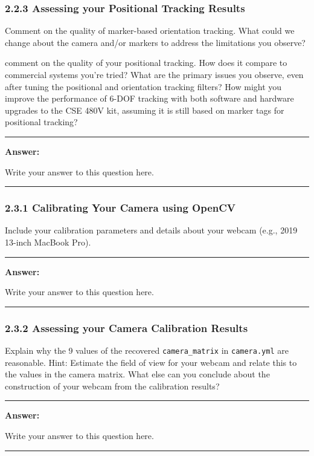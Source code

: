 \documentclass[conference]{styles/acmsiggraph}
\newenvironment{answer}{}{}
\begin{document}
\subsubsection*{2.2.3 Assessing your Positional Tracking Results}
Comment on the quality of marker-based orientation tracking. What could we change about the camera and/or markers to address the limitations you observe?

comment on the quality of your positional tracking. How does it compare to commercial systems you're tried? What are the primary issues you observe, even after tuning the positional and orientation tracking filters? How might you improve the performance of 6-DOF tracking with both software and hardware upgrades to the CSE 480V kit, assuming it is still based on marker tags for positional tracking?

\begin{answer}
\rule{\textwidth}{0.4pt}
	
	\textbf{Answer:}
	
	Write your answer to this question here.

\rule{\textwidth}{0.4pt}
\end{answer}

\subsubsection*{2.3.1 Calibrating Your Camera using OpenCV}
Include your calibration parameters and details about your webcam (e.g., 2019 13-inch MacBook Pro).

\begin{answer}
\rule{\textwidth}{0.4pt}
	
	\textbf{Answer:}
	
	Write your answer to this question here.

\rule{\textwidth}{0.4pt}
\end{answer}

\subsubsection*{2.3.2 Assessing your Camera Calibration Results} 
Explain why the 9 values of the recovered \texttt{camera\_matrix} in \texttt{camera.yml} are reasonable. Hint: Estimate the field of view for your webcam and relate this to the values in the camera matrix. What else can you conclude about the construction of your webcam from the calibration results?

\begin{answer}
\rule{\textwidth}{0.4pt}
	
	\textbf{Answer:}
	
	Write your answer to this question here.

\rule{\textwidth}{0.4pt}
\end{answer}
\end{document}
